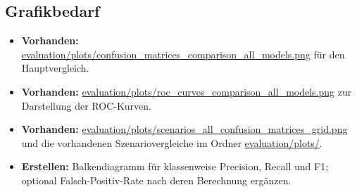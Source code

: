 \subsection{Grafikbedarf}
\begin{itemize}
  \item \textbf{Vorhanden:} \url{evaluation/plots/confusion_matrices_comparison_all_models.png}
        für den Hauptvergleich.
  \item \textbf{Vorhanden:} \url{evaluation/plots/roc_curves_comparison_all_models.png}
        zur Darstellung der ROC-Kurven.
  \item \textbf{Vorhanden:} \url{evaluation/plots/scenarios_all_confusion_matrices_grid.png}
        und die vorhandenen Szenariovergleiche im Ordner
        \url{evaluation/plots/}.
  \item \textbf{Erstellen:} Balkendiagramm für klassenweise Precision, Recall
        und F1; optional Falsch-Positiv-Rate nach deren Berechnung ergänzen.
\end{itemize}
